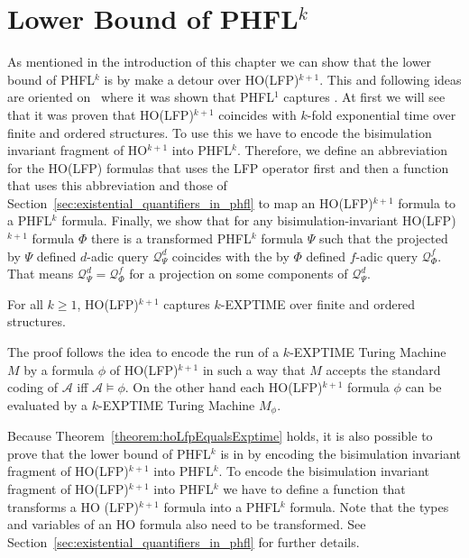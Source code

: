 
\section{Lower Bound of PHFL$^k$}\label{sec:lowerBoundOfPhfl}

As mentioned in the introduction of this chapter we can show that the lower bound of PHFL$^k$ is  by
make a detour over HO(LFP)$^{k+1}$. This and following ideas are oriented on~\cite{lange2014capturing} where it was
shown that PHFL$^1$ captures . At first we will see that it was proven that HO(LFP)$^{k +
1}$ coincides with $k$-fold exponential time over finite and ordered structures. To use this we have to encode the
bisimulation invariant fragment of HO$^{k+1}$ into PHFL$^k$. Therefore, we define an abbreviation for the HO(LFP)
formulas that uses the LFP operator first and then a function that uses this abbreviation and those of
Section~\ref{sec:existential_quantifiers_in_phfl} to map an HO(LFP)$^{k+1}$ formula to a PHFL$^k$ formula. Finally, we
show that for any bisimulation-invariant HO(LFP)$^{k+1}$ formula $\Phi$ there is a transformed PHFL$^k$ formula $\Psi$ such that the projected by $\Psi$ defined $d$-adic query $\mathcal{Q}^d_\Psi$ coincides with the by $\Phi$ defined $f$-adic query $\mathcal{Q}^f_\Phi$. That means $\mathcal{Q}^d_\Psi = \mathcal{Q}^f_\Phi$ for a projection on some components of $\mathcal{Q}^d_\Psi$.

\begin{theorem}{\cite{freireMartins2011descriptive}}\label{theorem:hoLfpEqualsExptime}
    For all $k \geq 1$, HO(LFP)$^{k + 1}$ captures $k$-EXPTIME over finite and ordered structures.
\end{theorem}

The proof follows the idea to encode the run of a $k$-EXPTIME Turing Machine $M$ by a formula $\phi$ of HO(LFP)$^{k +
1}$ in such a way that $M$ accepts the standard coding of $\mathcal{A}$ iff $\mathcal{A} \models \phi$. On the other hand each HO(LFP)$^{k +
1}$ formula $\phi$ can be evaluated by a $k$-EXPTIME Turing Machine $M_\phi$.

Because Theorem~\ref{theorem:hoLfpEqualsExptime} holds, it is also possible to prove that the lower bound of PHFL$^k$
is in  by encoding the bisimulation invariant fragment of HO(LFP)$^{k + 1}$ into PHFL$^k$. To encode the
bisimulation invariant fragment of HO(LFP)$^{k + 1}$ into PHFL$^k$ we have to define a function that transforms a HO
(LFP)$^{k + 1}$ formula into a PHFL$^k$ formula. Note that the types and variables of an HO formula also need to be
transformed. See Section~\ref{sec:existential_quantifiers_in_phfl} for further details.

